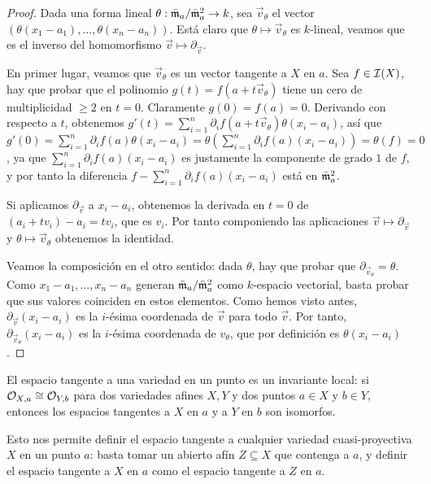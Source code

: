 \documentclass[ACGA.tex]{subfiles}
\begin{document}
\begin{proof}
 Dada una forma lineal $\theta:\bar{{\mathfrak{m}}}_a/\bar{{\mathfrak{m}}}_a^2\to k$, sea ${\overrightarrow v}_\theta$ el vector $(\theta(x_1-a_1),\ldots,\theta(x_n-a_n))$. Está claro que $\theta\mapsto{\overrightarrow v}_\theta$ es $k$-lineal, veamos que es el inverso del homomorfismo $\overrightarrow v \mapsto\partial_{\overrightarrow v}$.

En primer lugar, veamos que ${\overrightarrow v}_\theta$ es un vector tangente a $X$ en $a$. Sea $f\in\mathcal{I}(X)$, hay que probar que el polinomio $g(t)=f(a+t{\overrightarrow v}_\theta)$ tiene un cero de multiplicidad $\geq 2$ en $t=0$. Claramente $g(0)=f(a)=0$. Derivando con respecto a $t$, obtenemos $g'(t)=\sum_{i=1}^n \partial_if(a+t{\overrightarrow v}_\theta)\theta(x_i-a_i)$, así que $g'(0)=\sum_{i=1}^n \partial_if(a)\theta(x_i-a_i)=\theta(\sum_{i=1}^n\partial_i f(a)(x_i-a_i))=\theta(f)=0$, ya que $\sum_{i=1}^n\partial_i f(a)(x_i-a_i)$ es justamente la componente de grado $1$ de $f$, y por tanto la diferencia $f-\sum_{i=1}^n\partial_i f(a)(x_i-a_i)$ está en $\bar{{\mathfrak{m}}}_a^2$.

Si aplicamos $\partial_{\overrightarrow v}$ a $x_i-a_i$, obtenemos la derivada en $t=0$ de $(a_i+tv_i)-a_i=tv_i$, que es $v_i$. Por tanto componiendo las aplicaciones $\overrightarrow v \mapsto\partial_{\overrightarrow v}$ y $\theta\mapsto{\overrightarrow v}_\theta$ obtenemos la identidad. 

Veamos la composición en el otro sentido: dada $\theta$, hay que probar que $\partial_{\overrightarrow v_\theta}=\theta$. Como $x_1-a_1,\ldots,x_n-a_n$ generan $\bar{{\mathfrak{m}}}_a/\bar{{\mathfrak{m}}}_a^2$ como $k$-espacio vectorial, basta probar que sus valores coinciden en estos elementos. Como hemos visto antes, $\partial_{\overrightarrow v}(x_i-a_i)$ es la $i$-ésima coordenada de $\overrightarrow v$ para todo $\overrightarrow v$. Por tanto, $\partial_{\overrightarrow v_\theta}(x_i-a_i)$ es la $i$-ésima coordenada de $v_\theta$, que por definición es $\theta(x_i-a_i)$. 
\end{proof}

\begin{coro}\label{espaciotangenteinvariante}
 El espacio tangente a una variedad en un punto es un invariante local: si ${\cal O}_{X,a}\cong{\cal O}_{Y,b}$ para dos variedades afines $X,Y$ y dos puntos $a\in X$ y $b\in Y$, entonces los espacios tangentes a $X$ en $a$ y a $Y$ en $b$ son isomorfos. 
\end{coro}

Esto nos permite definir el espacio tangente a cualquier variedad cuasi-proyectiva $X$ en un punto $a$: basta tomar un abierto afín $Z\subseteq X$ que contenga a $a$, y definir el espacio tangente a $X$ en $a$ como el espacio tangente a $Z$ en $a$. 
\end{document}
